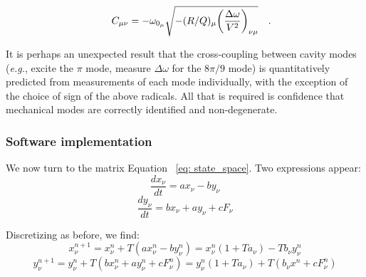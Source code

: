 \documentclass[a4paper,12pt]{article}
\newcommand{\be}{\begin{equation}}
\newcommand{\ee}{\end{equation}}
\begin{document}
\begin{equation}
 C_{\mu\nu} = -\omega_{0_{\mu}} \sqrt{-(R/Q)_{\mu}{ \left(\frac{\Delta \omega}{ V^2}\right)_{\nu \mu}}}\rlap{~~~.}
\end{equation}

It is perhaps an unexpected result that the cross-coupling between cavity modes ({\it e.g.}, excite the $\pi$ mode, measure $\Delta\omega$ for the $8\pi/9$ mode) is quantitatively predicted from measurements of each mode individually, with the exception of the choice of sign of the above radicals.  All that is required is confidence that mechanical modes are correctly identified and non-degenerate.

\subsubsection{Software implementation}

We now turn to the matrix Equation ~\ref{eq: state_space}. Two expressions appear:
\be
\frac{dx_{\nu}}{dt} = ax_{\nu} - by_{\nu}
\ee
\be
\frac{dy_{\nu}}{dt} = bx_{\nu} + ay_{\nu} + cF_{\nu}
\ee

Discretizing as before, we find: 
\be
\label{eq_x}
x^{n+1}_{\nu} = x^{n}_{\nu} + T(ax^{n}_{\nu} - by^{n}_{\nu}) = x^{n}_{\nu}(1 + Ta_{\nu}) - Tb_{\nu}y^{n}_{\nu}
\ee
\be
\label{eq_y}
y^{n+1}_{\nu} = y^{n}_{\nu} + T(bx^{n}_{\nu} + ay^{n}_{\nu} + cF^{n}_{\nu}) = y^{n}_{\nu}(1+Ta_{\nu}) + T(b_{\nu}x^{n} + cF^{n}_{\nu})
\ee
\end{document}
